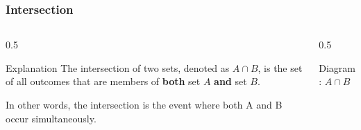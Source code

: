\begin{frame}
    \frametitle{Intersection}
    
    \begin{columns}[T]
        \begin{column}{0.5\textwidth}
            \begin{block}{Explanation}
                The intersection of two sets, denoted as \(A \cap B\), is the set of all outcomes that are members of \textbf{both} set $A$ \textbf{and} set $B$.
                \vspace{1cm}
                
                In other words, the intersection is the event where both A and B occur simultaneously.
            \end{block}
        \end{column}
        
        \begin{column}{0.5\textwidth}
            \begin{block}{Diagram: \(A \cap B\)}
                \centering
            \end{block}
        \end{column}
    \end{columns}
\end{frame}

